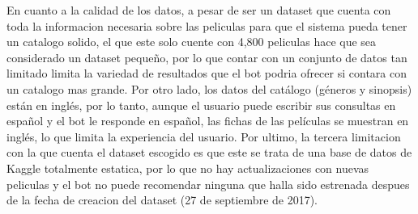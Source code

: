 En cuanto a la calidad de los datos, a pesar de ser un dataset que cuenta con toda la informacion necesaria sobre las peliculas para que el sistema pueda tener un catalogo solido, el que este solo cuente con 4,800 peliculas hace que sea considerado un dataset pequeño, por lo que contar con un conjunto de datos tan limitado limita la variedad de resultados que el bot podria ofrecer si contara con un catalogo mas grande. Por otro lado, los datos del catálogo (géneros y sinopsis) están en inglés, por lo tanto, aunque el usuario puede escribir sus consultas en español y el bot le responde en español, las fichas de las películas se muestran en inglés, lo que limita la experiencia del usuario. Por ultimo, la tercera limitacion con la que cuenta el dataset escogido es que este se trata de una base de datos de Kaggle totalmente estatica, por lo que no hay actualizaciones con nuevas peliculas y el bot no puede recomendar ninguna que halla sido estrenada despues de la fecha de creacion del dataset (27 de septiembre de 2017).